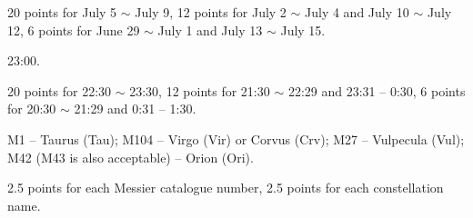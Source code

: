 20 points for July 5 $\sim$ July 9, 12 points for July 2 $\sim$ July 4 and
July 10 $\sim$ July 12, 6 points for June 29 $\sim$ July 1 and July 13
$\sim$ July 15.

23:00.

20 points for 22:30 $\sim$ 23:30, 12 points for 21:30 $\sim$ 22:29 and
23:31 -- 0:30, 6 points for 20:30 $\sim$ 21:29 and 0:31 -- 1:30.

M1 -- Taurus (Tau); M104 -- Virgo (Vir) or Corvus (Crv); M27 -- Vulpecula
(Vul); M42 (M43 is also acceptable) -- Orion (Ori).

2.5 points for each Messier catalogue number, 2.5 points for each
constellation name.

